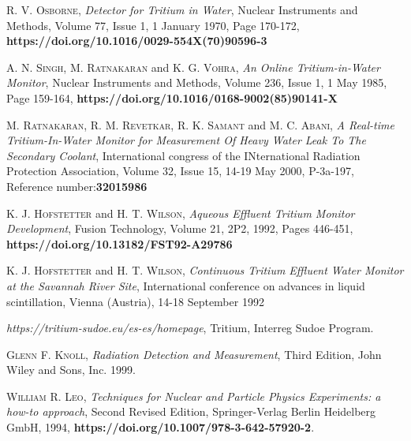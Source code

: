 \begin{thebibliography}{100}
 \textsc{R. V. Osborne},
\textit{Detector for Tritium in Water}, Nuclear Instruments and Methods, Volume 77, Issue 1, 1 January 1970, Page 170-172, \textbf{https://doi.org/10.1016/0029-554X(70)90596-3}

 \textsc{A. N. Singh}, \textsc{M. Ratnakaran} and \textsc{K. G. Vohra},
\textit{An Online Tritium-in-Water Monitor}, Nuclear Instruments and Methods, Volume 236, Issue 1, 1 May 1985, Page 159-164, \textbf{https://doi.org/10.1016/0168-9002(85)90141-X}

 \textsc{M. Ratnakaran}, \textsc{R. M. Revetkar}, \textsc{R. K. Samant} and \textsc{M. C. Abani},
\textit{A Real-time Tritium-In-Water Monitor for Measurement Of Heavy Water Leak To The Secondary Coolant}, International congress of the INternational Radiation Protection Association, Volume 32, Issue 15, 14-19 May 2000, P-3a-197, Reference number:\textbf{32015986}

 \textsc{K. J. Hofstetter} and \textsc{H. T. Wilson},
\textit{Aqueous Effluent Tritium Monitor Development}, Fusion Technology, Volume 21, 2P2, 1992, Pages 446-451, \textbf{https://doi.org/10.13182/FST92-A29786}

 \textsc{K. J. Hofstetter} and \textsc{H. T. Wilson},
\textit{Continuous Tritium Effluent Water Monitor at the Savannah River Site}, International conference on advances in liquid scintillation, Vienna (Austria), 14-18 September 1992

 \textit{https://tritium-sudoe.eu/es-es/homepage}, Tritium, Interreg Sudoe Program.

 \textsc{Glenn F. Knoll}, 
\textit{Radiation Detection and Measurement}, Third Edition, John Wiley and Sons, Inc. 1999.

 \textsc{William R. Leo},
\textit{Techniques for Nuclear and Particle Physics Experiments: a how-to approach}, Second Revised Edition, Springer-Verlag Berlin Heidelberg GmbH, 1994, \textbf{https://doi.org/10.1007/978-3-642-57920-2}. 

\end{thebibliography}